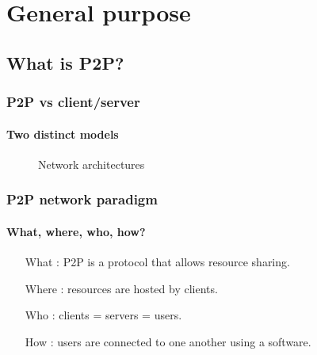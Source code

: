 
\section{General purpose}

  \begin{frame}
  \end{frame}

  \subsection{What is P2P?}
    \begin{frame}
      \frametitle{P2P vs client/server}
      \framesubtitle{Two distinct models}
      \begin{figure}
        \hfill
        \hfill
        \hfill
        \caption{Network architectures}
      \end{figure}
    \end{frame}
    
    \begin{frame}
      \frametitle{P2P network paradigm}
      \framesubtitle{What, where, who, how?}
      \begin{enumerate}
      \item[What] : P2P is a protocol that allows resource sharing.
      \item[Where] : resources are hosted by clients.
      \item[Who] : clients = servers = users.
      \item[How] : users are connected to one another using a software.
      \end{enumerate}
    \end{frame}
    
